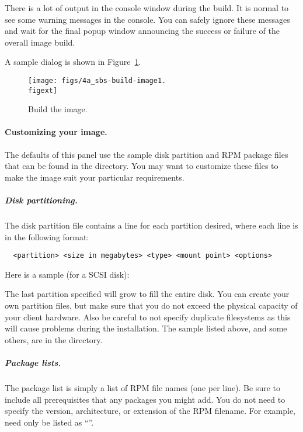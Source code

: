 There is a lot of output in the console window during the build.  It
is normal to see some warning messages in the console.  You can safely
ignore these messages and wait for the final popup window announcing
the success or failure of the overall image build.
  
A sample dialog is shown in Figure~\ref{fig:detailed-build-image}.

\begin{figure}[htbp]
  \begin{center}
    \texttt{[image: figs/4a\_sbs-build-image1.\\figext]}
    \caption{Build the image.}
    \label{fig:detailed-build-image}
  \end{center}
\end{figure}
  
\paragraph{Customizing your image.}

The defaults of this panel use the sample disk partition and RPM
package files that can be found in the  directory.
You may want to customize these files to make the image suit your
particular requirements.

\subparagraph{Disk partitioning.}

The disk partition file contains a line for each partition desired,
where each line is in the following format:

\begin{verbatim}
  <partition> <size in megabytes> <type> <mount point> <options>
\end{verbatim}

Here is a sample (for a SCSI disk):




The last partition specified will grow to fill the entire disk.  You
can create your own partition files, but make sure that you do not
exceed the physical capacity of your client hardware. Also be careful
to not specify duplicate filesystems as this will cause problems 
during the installation. The sample listed above, and some others, 
are in the  directory.

\subparagraph{Package lists.}

The package list is simply a list of RPM file names (one per line). Be
sure to include all prerequisites that any packages you might add.
You do not need to specify the version, architecture, or extension of
the RPM filename.  For example,  need only
be listed as ``''.


